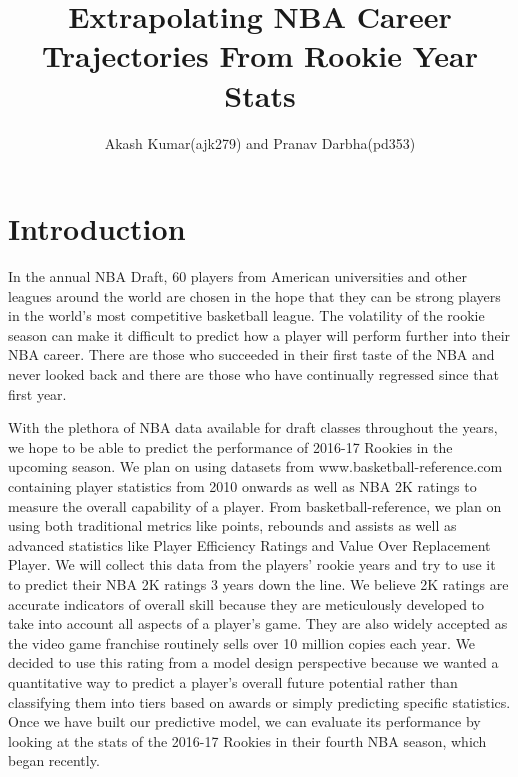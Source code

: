 \documentclass{article}
\title{Extrapolating NBA Career Trajectories From Rookie Year Stats}
\author{Akash Kumar(ajk279) and Pranav Darbha(pd353)}
\date{\vspace{-5ex}}
\begin{document}
\maketitle

\section{Introduction}
In the annual NBA Draft, 60 players from American universities and other leagues around the world are chosen in the hope that they can be strong players in the world's most competitive basketball league. The volatility of the rookie season can make it difficult to predict how a player will perform further into their NBA career. There are those who succeeded in their first taste of the NBA and never looked back and there are those who have continually regressed since that first year.

With the plethora of NBA data available for draft classes throughout the years, we hope to be able to predict the performance of 2016-17 Rookies in the upcoming season. We plan on using datasets from www.basketball-reference.com containing player statistics from 2010 onwards as well as NBA 2K ratings to measure the overall capability of a player. From basketball-reference, we plan on using both traditional metrics like points, rebounds and assists as well as advanced statistics like Player Efficiency Ratings and Value Over Replacement Player. We will collect this data from the players' rookie years and try to use it to predict their NBA 2K ratings 3 years down the line. We believe 2K ratings are accurate indicators of overall skill because they are meticulously developed to take into account all aspects of a player's game. They are also widely accepted as the video game franchise routinely sells over 10 million copies each year. We decided to use this rating from a model design perspective because we wanted a quantitative way to predict a player's overall future potential rather than classifying them into tiers based on awards or simply predicting specific statistics. Once we have built our predictive model, we can evaluate its performance by looking at the stats of the 2016-17 Rookies in their fourth NBA season, which began recently.
\end{document}
